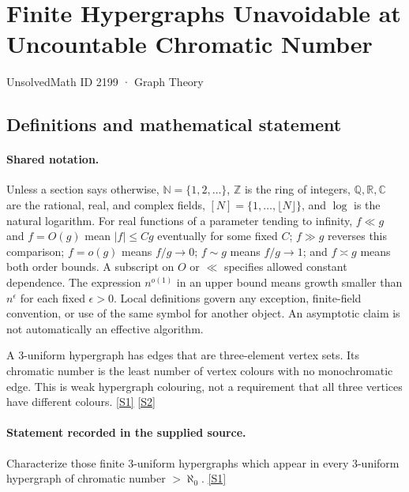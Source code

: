\documentclass[11pt,a4paper]{article}
\newcommand{\N}{\mathbb{N}}
\newcommand{\Z}{\mathbb{Z}}
\newcommand{\Q}{\mathbb{Q}}
\newcommand{\R}{\mathbb{R}}
\newcommand{\C}{\mathbb{C}}
\newcommand{\sref}[2]{\hyperlink{source:#1:#2}{[S#2]}}
\begin{document}

\setcounter{section}{2198}

\section{Finite Hypergraphs Unavoidable at Uncountable Chromatic Number}\label{2199}

{\small\sffamily UnsolvedMath ID 2199 · Graph Theory}

\subsection{Definitions and mathematical statement}

\paragraph{Shared notation.}Unless a section says otherwise, $\N=\{1,2,\ldots\}$,
$\Z$ is the ring of integers, $\Q,\R,\C$ are the rational, real, and complex
fields, $[N]=\{1,\ldots,\lfloor N\rfloor\}$, and $\log$ is the natural
logarithm. For real functions of a parameter tending to infinity,
$f\ll g$ and $f=O(g)$ mean $|f|\leq Cg$ eventually for some fixed $C$;
$f\gg g$ reverses this comparison; $f=o(g)$ means $f/g\to0$;
$f\sim g$ means $f/g\to1$; and $f\asymp g$ means both order bounds.
A subscript on $O$ or $\ll$ specifies allowed constant dependence.
The expression $n^{o(1)}$ in an upper bound means growth smaller than
$n^\epsilon$ for each fixed $\epsilon>0$. Local definitions govern any
exception, finite-field convention, or use of the same symbol for another
object. An asymptotic claim is not automatically an effective algorithm.



A 3-uniform hypergraph has edges that are three-element vertex sets. Its chromatic number is the least number of vertex colours with no monochromatic edge. This is weak hypergraph colouring, not a requirement that all three vertices have different colours. \sref{2199}{1} \sref{2199}{2}

\paragraph{Statement recorded in the supplied source.}
Characterize those finite 3-uniform hypergraphs which appear in every 3-uniform hypergraph of chromatic number $>\aleph_0$. \sref{2199}{1}
\end{document}
